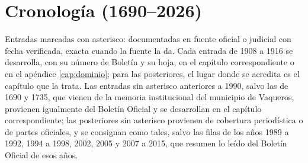 \chapter{Cronología (1690--2026)}
\label{cap:cronologia}

Entradas marcadas con asterisco: documentadas en fuente oficial o judicial con fecha verificada, exacta cuando la fuente la da. Cada entrada de 1908 a 1916 se desarrolla, con su número de Boletín y su hoja, en el capítulo correspondiente o en el apéndice \ref{cap:dominio}; para las posteriores, el lugar donde se acredita es el capítulo que la trata. Las entradas sin asterisco anteriores a 1990, salvo las de 1690 y 1735, que vienen de la memoria institucional del municipio de Vaqueros, provienen igualmente del Boletín Oficial y se desarrollan en el capítulo correspondiente; las posteriores sin asterisco provienen de cobertura periodística o de partes oficiales, y se consignan como tales, salvo las filas de los años 1989 a 1992, 1994 a 1998, 2002, 2005 y 2007 a 2015, que resumen lo leído del Boletín Oficial de esos años.

